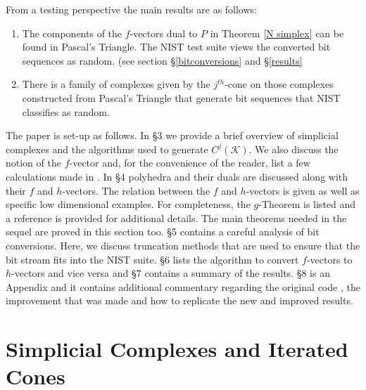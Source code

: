 \documentclass[oneside,12pt]{amsart}
\theoremstyle{definition}
\numberwithin{equation}{section}
\begin{document}
From a testing perspective the main results are as follows: %

\begin{enumerate}
  \item The components of the $f$-vectors dual to $P$ in Theorem \ref{N simplex} can be found in Pascal's Triangle.  The NIST test suite views the converted bit sequences as random. (see section \S\ref{bitconversions} and \S\ref{results}\\[.5ex] %
  
  \item There is a family of complexes given by the $j^{th}$-cone on those complexes constructed from Pascal's Triangle that generate bit sequences that NIST classifies as random. %
  
\end{enumerate}

The paper is set-up as follows.  In \S 3 we provide a brief overview of simplicial complexes and the algorithms used to generate $C^j(\mathcal{K})$.  We also discuss the notion of the $f$-vector and, for the convenience of the reader, list a few calculations made in \cite{ALDH}.  In \S 4 polyhedra and their duals are discussed along with their $f$ and $h$-vectors.  The relation between the $f$ and $h$-vectors is given as well as specific low dimensional examples.  For completeness, the $g$-Theorem is listed and a reference is provided for additional details.  The main theorems needed in the sequel are proved in this section too.  \S 5 contains a careful analysis of bit conversions.  Here, we discuss truncation methods that are used to ensure that the bit stream fits into the NIST suite.  \S 6 lists the algorithm to convert $f$-vectors to $h$-vectors and vice versa and \S 7 contains a summary of the results. \S8 is an Appendix and it contains additional commentary regarding the original code \cite{ALDH}, the improvement that was made and how to replicate the new and improved results.

\section{Simplicial Complexes and Iterated Cones}
\end{document}
